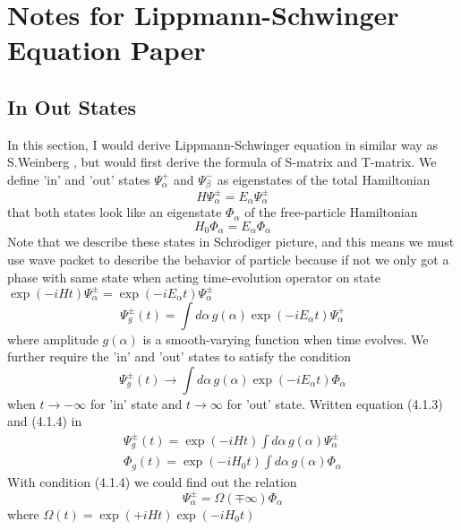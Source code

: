 \documentclass[12pt]{article}
\numberwithin{equation}{subsection}
\begin{document}
\section{Notes for Lippmann-Schwinger Equation Paper}
\subsection{In Out States}
In this section, I would derive Lippmann-Schwinger equation in similar way as S.Weinberg \cite{Weinberg_2015}, but would first derive the formula of S-matrix and T-matrix.
We define 'in' and 'out' states $\Psi_{\alpha}^{+}$ and $\Psi_{\beta}^{-}$ as eigenstates of the total Hamiltonian
\begin{equation}
    H\Psi_{\alpha}^{\pm} = E_{\alpha}\Psi_{\alpha}^{\pm}
\end{equation}
that both states look like an eigenstate $\Phi_{\alpha}$ of the free-particle Hamiltonian
\begin{equation}
    H_0\Phi_{\alpha} = E_{\alpha}\Phi_{\alpha}
\end{equation}
Note that we describe these states in Schr$\ddot{\text{o}}$diger picture, and this means we must use wave packet to describe the behavior of particle because if not we only got a phase with same state when acting time-evolution operator on state $\exp(-iHt)\Psi_{\alpha}^{\pm} = \exp(-iE_{\alpha}t)\Psi_{\alpha}^{\pm}$
\begin{equation}
    \Psi_{g}^{\pm}(t) = \int{d\alpha\,g(\alpha)\exp(-iE_{\alpha}t)\Psi_{\alpha}^{+}}
\end{equation}
where amplitude $g(\alpha)$ is a smooth-varying function when time evolves.
We further require the 'in' and 'out' states to satisfy the condition
\begin{equation}
    \Psi_{g}^{\pm}(t)\rightarrow \int{d\alpha\,g(\alpha)\exp(-iE_{\alpha}t)\Phi_{\alpha}}
\end{equation}
when $t\rightarrow-\infty$ for 'in' state and $t\rightarrow\infty$ for 'out' state.
Written equation (4.1.3) and (4.1.4) in 
\begin{equation}
    \begin{split}
        \Psi_{g}^{\pm}(t) = \exp(-iHt)\int{d\alpha\,g(\alpha)\Psi_{\alpha}^{\pm}}\\
        \Phi_{g}(t) = \exp(-iH_0t)\int{d\alpha\,g(\alpha)\Phi_{\alpha}}
    \end{split}
\end{equation}
With condition (4.1.4) we could find out the relation
\begin{equation}
    \Psi_{\alpha}^{\pm} = \Omega(\mp\infty)\Phi_{\alpha}
\end{equation}
where $\Omega(t) = \exp(+iHt)\exp(-iH_0t)$
\end{document}
